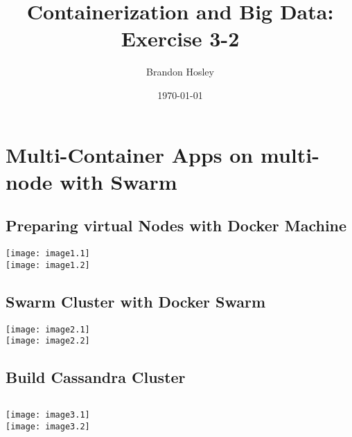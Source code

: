 \documentclass[]{article}
\title{Containerization and Big Data: Exercise 3-2}
\author{Brandon Hosley}
\date{\today}
\begin{document}
\maketitle

\setcounter{section}{2}
\section{Multi-Container Apps on multi-node with Swarm}
\setcounter{subsection}{5}

\subsection{Preparing virtual Nodes with Docker Machine}
	\texttt{[image: image1.1]} \vspace{1em} \\ 
	\texttt{[image: image1.2]} \\
\subsection{Swarm Cluster with Docker Swarm}
	\texttt{[image: image2.1]} \vspace{1em} \\
	\texttt{[image: image2.2]} \\
\subsection{Build Cassandra Cluster}
	\inputminted[baselinestretch=1.2, bgcolor=light-gray, fontsize=\footnotesize]{qml}{docker-compose.yml}
	\texttt{[image: image3.1]} \vspace{1em} \\
	\texttt{[image: image3.2]} \\
\end{document}

